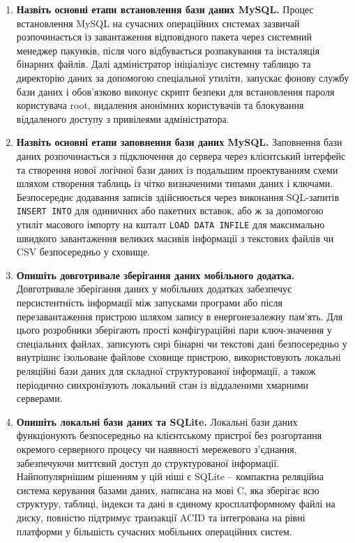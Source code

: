\documentclass[14pt, a4paper]{extreport}
\begin{document}
	\begin{enumerate}
		\item \textbf{Назвіть основні етапи встановлення бази даних MySQL.} Процес встановлення MySQL на сучасних операційних системах зазвичай розпочинається із завантаження відповідного пакета через системний менеджер пакунків, після чого відбувається розпакування та інсталяція бінарних файлів. Далі адміністратор ініціалізує системну таблицю та директорію даних за допомогою спеціальної утиліти, запускає фонову службу бази даних і обов'язково виконує скрипт безпеки для встановлення пароля користувача root, видалення анонімних користувачів та блокування віддаленого доступу з привілеями адміністратора.\\
		
		\item \textbf{Назвіть основні етапи заповнення бази даних MySQL.} Заповнення бази даних розпочинається з підключення до сервера через клієнтський інтерфейс та створення нової логічної бази даних із подальшим проектуванням схеми шляхом створення таблиць із чітко визначеними типами даних і ключами. Безпосереднє додавання записів здійснюється через виконання SQL-запитів \texttt{INSERT INTO} для одиничних або пакетних вставок, або ж за допомогою утиліт масового імпорту на кшталт \texttt{LOAD DATA INFILE} для максимально швидкого завантаження великих масивів інформації з текстових файлів чи CSV безпосередньо у сховище.
		
		\item \textbf{Опишіть довготривале зберігання даних мобільного додатка.} Довготривале зберігання даних у мобільних додатках забезпечує персистентність інформації між запусками програми або після перезавантаження пристрою шляхом запису в енергонезалежну пам'ять. Для цього розробники зберігають прості конфігураційні пари ключ-значення у спеціальних файлах, записують сирі бінарні чи текстові дані безпосередньо у внутрішнє ізольоване файлове сховище пристрою, використовують локальні реляційні бази даних для складної структурованої інформації, а також періодично синхронізують локальний стан із віддаленими хмарними серверами.
		
		\item \textbf{Опишіть локальні бази даних та SQLite.} Локальні бази даних функціонують безпосередньо на клієнтському пристрої без розгортання окремого серверного процесу чи наявності мережевого з'єднання, забезпечуючи миттєвий доступ до структурованої інформації. Найпопулярнішим рішенням у цій ніші є SQLite -- компактна реляційна система керування базами даних, написана на мові C, яка зберігає всю структуру, таблиці, індекси та дані в єдиному кросплатформному файлі на диску, повністю підтримує транзакції ACID та інтегрована на рівні платформи у більшість сучасних мобільних операційних систем.
		

\end{enumerate}
\end{document}
